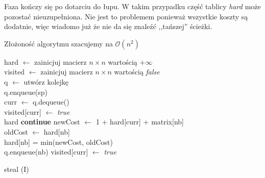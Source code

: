 \documentclass[12pt]{article}
\begin{document}
Faza kończy się po dotarciu do łupu. W takim przypadku część tablicy \emph{hard} może pozostać nieuzupełniona. Nie jest to problemem ponieważ wszystkie koszty są dodatnie, więc wiadomo już że nie da się znaleźć ,,tańszej'' ścieżki.

Złożoność algorytmu szacujemy na $\mathcal{O}(n^2)$
\begin{algorithm}[p]
\Begin
{
	hard $\leftarrow$ zainicjuj macierz $n \times n$ wartością $+\infty$ \\
	visited $\leftarrow$ zainicjuj macierz $n \times n$ wartością 
\emph{false} \\
	q $\leftarrow$ utwórz kolejkę \\
	q.enqueue(sp) \\
	{
		curr $\leftarrow$ q.dequeue()\\
		visited[curr] $\leftarrow$ \emph{true}\\
		{
			\Return hard
		}
		{
			{
				\textbf{continue} 
			}
			newCost $\leftarrow$ 1 + hard[curr] + matrix[nb] \\
			oldCost $\leftarrow$ hard[nb] \\
			hard[nb] = min(newCost, oldCost) \\
			{
				q.enqueue(nb)
			}
		}
		visited[curr] $\leftarrow$ \emph{true}
	}
	
	
}
\caption{steal (I)}
\end{algorithm}
\end{document}
